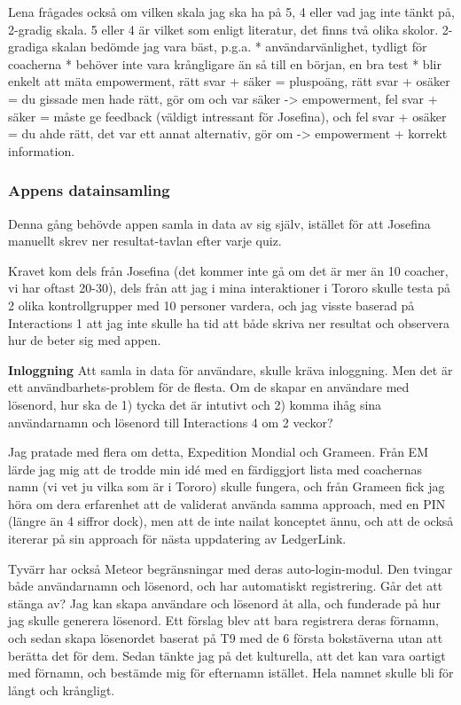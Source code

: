 Lena frågades också om vilken skala jag ska ha på 5, 4 eller vad jag inte tänkt på, 2-gradig skala. 5 eller 4 är vilket som enligt literatur, det finns två olika skolor. 2-gradiga skalan bedömde jag vara bäst, p.g.a.
* användarvänlighet, tydligt för coacherna
* behöver inte vara krångligare än så till en början, en bra test
* blir enkelt att mäta empowerment, rätt svar + säker = pluspoäng, rätt svar + osäker = du gissade men hade rätt, gör om och var säker -> empowerment, fel svar + säker = måste ge feedback (väldigt intressant för Josefina), och fel svar + osäker = du ahde rätt, det var ett annat alternativ, gör om -> empowerment + korrekt information.

\subsubsection{Appens datainsamling}
Denna gång behövde appen samla in data av sig själv, istället för att Josefina manuellt skrev ner resultat-tavlan efter varje quiz.

Kravet kom dels från Josefina (det kommer inte gå om det är mer än 10 coacher, vi har oftast 20-30), dels från att jag i mina interaktioner i Tororo skulle testa på 2 olika kontrollgrupper med 10 personer vardera, och jag visste baserad på Interactions 1 att jag inte skulle ha tid att både skriva ner resultat och observera hur de beter sig med appen.

\textbf{Inloggning}
Att samla in data för användare, skulle kräva inloggning. Men det är ett användbarhets-problem för de flesta. Om de skapar en användare med lösenord, hur ska de 1) tycka det är intutivt och 2) komma ihåg sina användarnamn och lösenord till Interactions 4 om 2 veckor?

Jag pratade med flera om detta, Expedition Mondial och Grameen. Från EM lärde jag mig att de trodde min idé med en färdiggjort lista med coachernas namn (vi vet ju vilka som är i Tororo) skulle fungera, och från Grameen fick jag höra om dera erfarenhet att de validerat använda samma approach, med en PIN (längre än 4 siffror dock), men att de inte nailat konceptet ännu, och att de också itererar på sin approach för nästa uppdatering av LedgerLink.

Tyvärr har också Meteor begränsningar med deras auto-login-modul. Den tvingar både användarnamn och lösenord, och har automatiskt registrering. Går det att stänga av? Jag kan skapa användare och lösenord åt alla, och funderade på hur jag skulle generera lösenord. Ett förslag blev att bara registrera deras förnamn, och sedan skapa lösenordet baserat på T9 med de 6 första bokstäverna utan att berätta det för dem. Sedan tänkte jag på det kulturella, att det kan vara oartigt med förnamn, och bestämde mig för efternamn istället. Hela namnet skulle bli för långt och krångligt.

